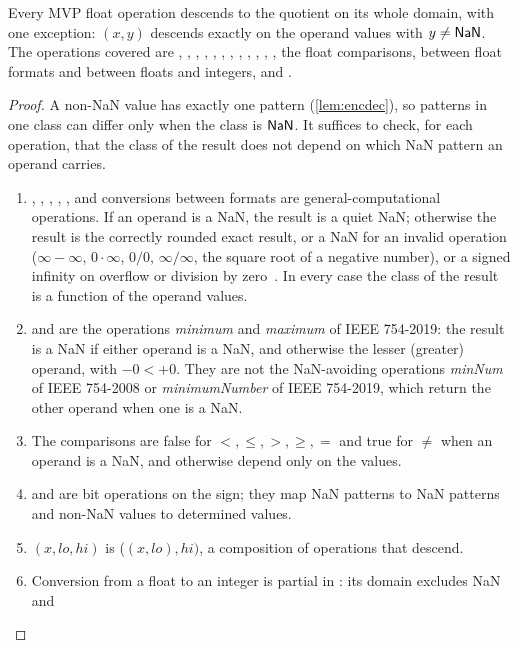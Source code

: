 \begin{theorem}\label{thm:float-congruence}
Every MVP float operation descends to the quotient on its whole domain, with one exception:
$(x,y)$ descends exactly on the operand values with $y\neq\mathsf{NaN}$. The operations
covered are , , , , , , ,
, , , , , the float comparisons, 
between float formats and between floats and integers, and .
\end{theorem}
\begin{proof}
A non-NaN value has exactly one pattern (\cref{lem:encdec}), so patterns in one class can
differ only when the class is $\mathsf{NaN}$. It suffices to check, for each operation, that the class
of the result does not depend on which NaN pattern an operand carries.
\begin{enumerate}[label=(\alph*)]
\item {}, , , , ,  and conversions between
  formats are general-computational operations. If an operand is a NaN, the result is a quiet
  NaN; otherwise the result is the correctly rounded exact result, or a NaN for an invalid
  operation ($\infty-\infty$, $0\cdot\infty$, $0/0$, $\infty/\infty$, the square root of a
  negative number), or a signed infinity on overflow or division by zero~\cite{ieee754-2019}.
  In every case the class of the result is a function of the operand values.
\item {} and  are the operations \emph{minimum} and \emph{maximum} of IEEE
  754-2019: the result is a NaN if either operand is a NaN, and otherwise the lesser (greater)
  operand, with $-0<+0$. They are not the NaN-avoiding operations \emph{minNum} of IEEE
  754-2008 or \emph{minimumNumber} of IEEE 754-2019, which return the other operand when one
  is a NaN.
\item The comparisons are false for $<,\le,>,\ge,=$ and true for $\neq$ when an operand is a NaN,
  and otherwise depend only on the values.
\item {} and  are bit operations on the sign; they map NaN patterns to NaN
  patterns and non-NaN values to determined values.
\item {}$(x,lo,hi)$ is ($(x,lo),hi)$, a composition of operations
  that descend.
\item Conversion from a float to an integer is partial in \VG{}: its domain excludes NaN and

\end{enumerate}
\end{proof}
